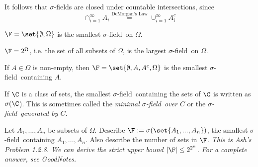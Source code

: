 \documentclass{article} %
\renewcommand{\sf}{$\sigma$-field}
\begin{document}
\begin{remark}
It follows that $\sigma$-fields are closed under countable intersections, since
\[ \cap_{i=1}^\infty A_i \stackrel{\text{DeMorgan's Law}}{=} \cup_{i=1}^\infty A_i^c \]	
\end{remark}

\begin{example}
$\F =\set{\emptyset, \Omega}$ is the smallest \sf\ on $\Omega$. 
\end{example}

\begin{example}
	$\F =2^\Omega$, i.e. the set of all subsets of $\Omega$, is the largest \sf\ on $\Omega$.
\end{example}

\begin{example}
If $A \in \Omega$ is non-empty, then $\F = \set{\emptyset, A, A^c, \Omega}$ is the smallest \sf\ containing $A$.
\end{example}

\begin{notation}
If $\C$ is a class of sets, the smallest \sf\ containing the sets of $\C$ is written as $\sigma(\C$).  This is sometimes called the \textit{minimal \sf\ over $C$} or the \textit{\sf\ generated by $C$}. 
\end{notation}
	
\begin{exercise}
\label{exercise:minimal_sigma_field_containing_n_subsets}
Let $A_1,...,A_n$ be subsets of $\Omega$.  Describe $\F := \sigma(\set{A_1,...,A_n})$, the smallest \sf\ containing $A_1,...,A_n$.  Also describe the number of sets in $\F$.   \textit{This is Ash's Problem 1.2.8.  We can derive the strict upper bound $|\F| \leq 2^{2^n}$. For a complete answer, see GoodNotes. }	
\end{exercise}
\end{document}
